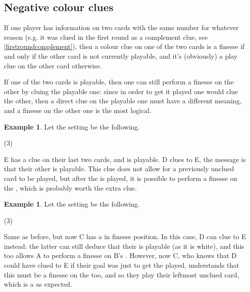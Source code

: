 \documentclass[a4paper]{article}
\theoremstyle{plain}
\theoremstyle{definition}
\newtheorem{example}[theorem]{Example}
\begin{document}
\subsection{Negative colour clues}

If one player has information on two cards with the same number for whatever reason (e.g. it was clued  in the first round as a complement clue, see \ref{firstroundcomplement}), then a colour clue on one of the two cards is a finesse if and only if the other card is not currently playable, and it's (obviously) a play clue on the other card otherwise.

If one of the two cards is playable, then one can still perform a finesse on the other by cluing the playable one: since in order to get it played one would clue the other, then a direct clue on the playable one must have a different meaning, and a finesse on the other one is the most logical.

\begin{example}
	
	Let the setting be the following.
	
	\begin{tasks}(3)
		\task[+]      
		\task[A]    
		\task[B]    
		\task[C]    
		\task[D]    
		\task[E]    
	\end{tasks}
	
	E has a  clue on their last two cards, and  is playable. D clues  to E, the message is that their other  is playable. This clue does not allow for a previously unclued card to be played, but after the  is played, it is possible to perform a finesse on the , which is probably worth the extra clue.
	
\end{example}

\begin{example}
	
	Let the setting be the following.
	
	\begin{tasks}(3)
		\task[+]      
		\task[A]    
		\task[B]    
		\task[C]    
		\task[D]    
		\task[E]    
	\end{tasks}
	
	Same as before, but now C has a  in finesse position. In this case, D can clue  to E instead: the latter can still deduce that their  is playable (as it is white), and this too allows A to perform a finesse on B's . However, now C, who knows that D could have clued  to E if their goal was just to get the  played, understands that this must be a finesse on the  too, and so they play their leftmost unclued card, which is a  as expected.
	
\end{example}
\end{document}
